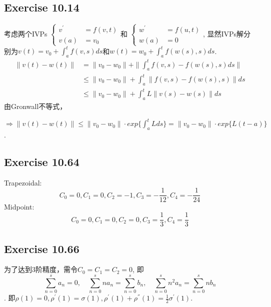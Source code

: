 \documentclass[UTF8]{ctexart}
\begin{document}
\pagestyle{fancy}
\fancyhead{}
\rhead{\today}




\subsection*{Exercise 10.14}
考虑两个IVPs
$
\left\{
\begin{aligned}
v^{'} &= f(v,t) \\
v(a) &= v_0  
\end{aligned}
\right.
$和
$
\left\{
\begin{aligned}
w^{'} &= f(u,t) \\  
w(a) &= 0  
\end{aligned}
\right.
$,
显然IVPs解分别为$v(t) = v_0 + \int_{a}^{t} f(v,s) d s$和$w(t) = w_0 + \int_a^t f(w(s),s) d s$.
\begin{align*}
    \|v(t) - w(t)\| &= \|v_0 -w_0\| + \| \int_{a}^{t} f(v,s) - f(w(s),s) d s \| \\
                    &\leq \|v_0 -w_0\| + \int_{a}^{t} \|f(v,s) - f(w(s),s)\| d s \\
                    &\leq \|v_0 - w_0\| + \int_{a}^{t} L\|v(s) - w(s) \| ds
\end{align*}
由Gronwall不等式，

$\Rightarrow \|v(t) - w(t)\| \leq \|v_0 - w_0\|\cdot exp\{\int_{a}^{t} L ds\} = \|v_0 - w_0\| \cdot exp\{L(t-a)\}$.


\subsection*{Exercise 10.64}
Trapezoidal:
$$C_0 = 0, C_1 = 0, C_2 = -1, C_3 = -\frac{1}{12}, C_4 = -\frac{1}{24}$$
Midpoint:
$$C_0 = 0, C_1 = 0, C_2 = 0, C_3 = \frac{1}{3}, C_4 = \frac{1}{3}$$

\subsection*{Exercise 10.66}
为了达到3阶精度，需令$C_0 = C_1 = C_2 = 0$, 即
$$\sum_{n = 0}^{s} a_n = 0, \quad \sum_{n = 0}^{s} na_n = \sum_{n = 0}^{s} b_n, \quad \sum_{n = 0}^{s} n^2a_n = \sum_{n = 0}^{s} nb_n$$.
即$\rho(1) = 0, \rho^{'}(1) = \sigma (1), \rho^{'}(1) + \rho^{''}(1) = \frac{1}{2}\sigma^{'}(1)$.
\end{document}
